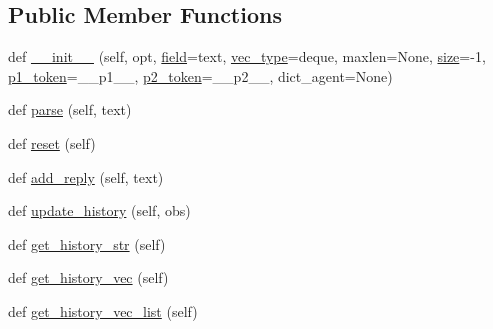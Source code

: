 \subsection*{Public Member Functions}
\begin{DoxyCompactItemize}
\item 
def \hyperlink{classparlai_1_1core_1_1torch__agent_1_1History_af2670eff50563dcee5da6581355e758f}{\+\_\+\+\_\+init\+\_\+\+\_\+} (self, opt, \hyperlink{classparlai_1_1core_1_1torch__agent_1_1History_a3481b17d1cd076c5e3ee82178ea7411a}{field}=\textquotesingle{}text\textquotesingle{}, \hyperlink{classparlai_1_1core_1_1torch__agent_1_1History_a7e5b6e0372fa48e0e1ba747b5628bfc7}{vec\+\_\+type}=\textquotesingle{}deque\textquotesingle{}, maxlen=None, \hyperlink{classparlai_1_1core_1_1torch__agent_1_1History_a18b6c863146d30b93d15de840566044b}{size}=-\/1, \hyperlink{classparlai_1_1core_1_1torch__agent_1_1History_a7eff0681e0eee4051abb530797f15884}{p1\+\_\+token}=\textquotesingle{}\+\_\+\+\_\+p1\+\_\+\+\_\+\textquotesingle{}, \hyperlink{classparlai_1_1core_1_1torch__agent_1_1History_ab9f9f10b0dd73d90d3798fb3e1787ee6}{p2\+\_\+token}=\textquotesingle{}\+\_\+\+\_\+p2\+\_\+\+\_\+\textquotesingle{}, dict\+\_\+agent=None)
\item 
def \hyperlink{classparlai_1_1core_1_1torch__agent_1_1History_a7758c7e9d42442ac228b820be4298d84}{parse} (self, text)
\item 
def \hyperlink{classparlai_1_1core_1_1torch__agent_1_1History_a82e02d0b34707b2e00b95bc659411bae}{reset} (self)
\item 
def \hyperlink{classparlai_1_1core_1_1torch__agent_1_1History_a144a39a05745ecd374e9a79c73f5ee66}{add\+\_\+reply} (self, text)
\item 
def \hyperlink{classparlai_1_1core_1_1torch__agent_1_1History_a433d24b0b497a71ef92ac700f5a54065}{update\+\_\+history} (self, obs)
\item 
def \hyperlink{classparlai_1_1core_1_1torch__agent_1_1History_a29576ee0dd27b8ee5e651297dada3131}{get\+\_\+history\+\_\+str} (self)
\item 
def \hyperlink{classparlai_1_1core_1_1torch__agent_1_1History_a0d9c7a847af118f77e9986279acf7dea}{get\+\_\+history\+\_\+vec} (self)
\item 
def \hyperlink{classparlai_1_1core_1_1torch__agent_1_1History_a117862fe92da69172cb8e0c494bcd280}{get\+\_\+history\+\_\+vec\+\_\+list} (self)
\end{DoxyCompactItemize}
